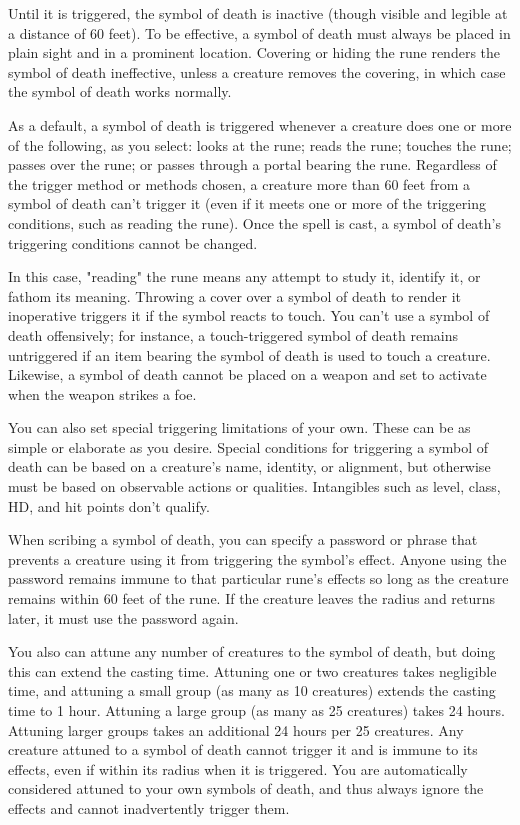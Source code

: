 {Until it is triggered, the symbol of death is inactive (though visible and legible at a distance of 60 feet). To be effective, a symbol of death must always be placed in plain sight and in a prominent location. Covering or hiding the rune renders the symbol of death ineffective, unless a creature removes the covering, in which case the symbol of death works normally.

As a default, a symbol of death is triggered whenever a creature does one or more of the following, as you select: looks at the rune; reads the rune; touches the rune; passes over the rune; or passes through a portal bearing the rune. Regardless of the trigger method or methods chosen, a creature more than 60 feet from a symbol of death can't trigger it (even if it meets one or more of the triggering conditions, such as reading the rune). Once the spell is cast, a symbol of death's triggering conditions cannot be changed.

In this case, "reading" the rune means any attempt to study it, identify it, or fathom its meaning. Throwing a cover over a symbol of death to render it inoperative triggers it if the symbol reacts to touch. You can't use a symbol of death offensively; for instance, a touch-triggered symbol of death remains untriggered if an item bearing the symbol of death is used to touch a creature. Likewise, a symbol of death cannot be placed on a weapon and set to activate when the weapon strikes a foe.

You can also set special triggering limitations of your own. These can be as simple or elaborate as you desire. Special conditions for triggering a symbol of death can be based on a creature's name, identity, or alignment, but otherwise must be based on observable actions or qualities. Intangibles such as level, class, HD, and hit points don't qualify.

When scribing a symbol of death, you can specify a password or phrase that prevents a creature using it from triggering the symbol's effect. Anyone using the password remains immune to that particular rune's effects so long as the creature remains within 60 feet of the rune. If the creature leaves the radius and returns later, it must use the password again.

You also can attune any number of creatures to the symbol of death, but doing this can extend the casting time. Attuning one or two creatures takes negligible time, and attuning a small group (as many as 10 creatures) extends the casting time to 1 hour. Attuning a large group (as many as 25 creatures) takes 24 hours. Attuning larger groups takes an additional 24 hours per 25 creatures. Any creature attuned to a symbol of death cannot trigger it and is immune to its effects, even if within its radius when it is triggered. You are automatically considered attuned to your own symbols of death, and thus always ignore the effects and cannot inadvertently trigger them.

}
